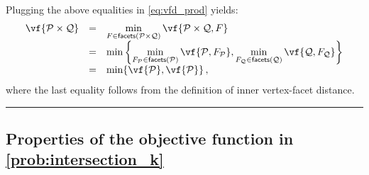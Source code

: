 \documentclass{article}
\newcommand{\jmlrBlackBox}{\rule{1.5ex}{1.5ex}}
\newcommand{\jmlrQED}{\hfill\jmlrBlackBox\par\bigskip}
\providecommand{\proofname}{Proof}
\renewenvironment{proof}%
{%
 \par\noindent{\bfseries\upshape \proofname\ }%
}%
{\jmlrQED}
\newcommand{\mP}{\mathcal{P}}
\newcommand{\mQ}{\mathcal{Q}}
\newcommand{\facets}[1]{\mathsf{facets}\left(#1\right)}
\DeclarePairedDelimiter\ceil{\lceil}{\rceil}
\DeclarePairedDelimiter\floor{\lfloor}{\rfloor}
\begin{document}
\begin{proof}
Plugging the above equalities in \cref{eq:vfd_prod} yields:
\[
\begin{array}{rcl}
\vf{\mP \times \mQ} &=& \displaystyle\min_{F \in \facets{\mP \times \mQ}} \vf{\mP \times \mQ, F}\\
&=& \min \left\{\displaystyle \min_{F_\mP \in \facets{\mP}} \vf{\mP, F_\mP}, \min_{F_\mQ \in \facets{\mQ}} \vf{\mQ, F_\mQ}\right\}\\
&=& \min\{\vf{\mP}, \vf{\mP}\}\,,
\end{array}
\]
where the last equality follows from the definition of inner vertex-facet distance.
\end{proof}
%
%
%
%
%
%
%
%
%
%
\subsection{Properties of the objective function in \cref{prob:intersection_k}}\label{a:obj}
\end{document}
